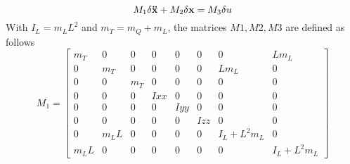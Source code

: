 \begin{equation}\label{eq:app.2ode}
{M_1}
\delta \mathbf{\ddot{x}}
\newline
+
{M_2}
\delta \mathbf{x}
=
{M_3}
\delta u
\end{equation}
With $ I_L = m_LL^2$ and $ m_T=m_Q+m_L $, the matrices $ M1,M2,M3 $ are defined as follows
\begin{equation}\label{key}
M_1 = 
\begin{bmatrix}
m_T&0&0&0&0&0&0&Lm_L\\%
0&m_T&0&0&0&0&Lm_L&0\\%
0&0&m_T&0&0&0&0&0\\%
0&0&0&Ixx&0&0&0&0\\%
0&0&0&0&Iyy&0&0&0\\%
0&0&0&0&0&Izz&0&0\\%
0&m_LL&0&0&0&0&I_L+L^2m_L&0\\%
m_LL&0&0&0&0&0&0&I_L+L^2m_L%
\end{bmatrix}
\end{equation}
